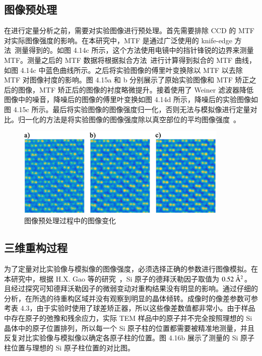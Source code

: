 \subsection{图像预处理}
在进行定量分析之前，需要对实验图像进行预处理。首先需要排除 CCD 的 MTF 对实际图像强度的影响。在本研究中，MTF 是通过广泛使用的 knife-edge 方法~\cite{Thust2009}测量得到的。如图 4.14c 所示，这个方法使用电镜中的挡针锋锐的边界来测量 MTF。测量之后的 MTF 数据将根据拟合方法~\cite{VanBroek2012}进行计算得到拟合的 MTF 曲线，如图 4.14c 中蓝色曲线所示。之后将实验图像的傅里叶变换除以 MTF 以去除 MTF 对图像衬度的影响。图 4.15a 和 b 分别展示了原始实验图像和 MTF 矫正之后的图像，MTF 矫正后的图像的衬度略微提升。接着使用了 Weiner 滤波器降低图像中的噪音，降噪后的图像的傅里叶变换如图 4.14d 所示，降噪后的实验图像如图 4.15c 所示。最后将实验图像的图像强度归一化，否则无法与模拟像进行定量对比。归一化的方法是将实验图像的图像强度除以真空部位的平均图像强度~\cite{Hytch1994}。

\begin{figure}[htbp]
	\vspace{\baselineskip}
	\centering
	\includegraphics[width=0.9\textwidth]{../2.14/214}
	\caption{图像预处理过程中的图像变化}\label{fig:214}
	\song{}
\end{figure}

\subsection{三维重构过程}
为了定量对比实验像与模拟像的图像强度，必须选择正确的参数进行图像模拟。在本研究中，根据 H.X. Gao 等的研究~\cite{Gao1999}，Si 原子的德拜沃勒因子取值为 $\rm{0.52\ \mathring{A}^2}$。且经过探究可知德拜沃勒因子的微弱变动对重构结果没有明显的影响。通过仔细的分析，在所选的待重构区域并没有观察到明显的晶体倾转。成像时的像差参数可参考表 4.3，由于实验时使用了球差矫正器，所以这些像差数值都非常小。由于样品中存在原子的弛豫和残余应力，实际 TEM 样品中的原子并不完全按照理想的 Si 晶体中的原子位置排列，所以每一个 Si 原子柱的位置都需要被精准地测量，并且反复对比实验像与模拟像以确定各原子柱的位置。图 4.16b 展示了测量的 Si 原子柱位置与理想的 Si 原子柱位置的对比图。




